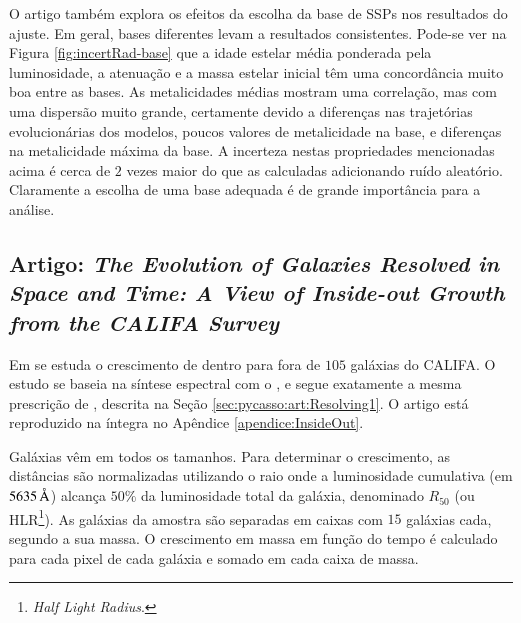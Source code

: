 O artigo também explora os efeitos da escolha da base de SSPs nos resultados do
ajuste. Em geral, bases diferentes levam a resultados consistentes.
Pode-se ver na Figura \ref{fig:incertRad-base} que a idade estelar
média ponderada pela luminosidade, a atenuação e a massa estelar inicial
têm uma concordância muito boa entre as bases. As metalicidades médias mostram
uma correlação, mas com uma dispersão muito grande, certamente devido a
diferenças nas trajetórias evolucionárias dos modelos, poucos valores
de metalicidade na base, e diferenças na metalicidade máxima da base. A
incerteza nestas propriedades mencionadas acima é cerca de $2$ vezes maior do
que as calculadas adicionando ruído aleatório. Claramente a escolha de uma base
adequada é de grande importância para a análise.



\subsection{Artigo: {\em The Evolution of Galaxies Resolved in Space and Time: A
View of Inside-out Growth from the CALIFA Survey}}
\label{sec:pycasso:art:InsideOut}

Em \citet{Perez2013} se estuda o crescimento de dentro para fora de $105$
galáxias do CALIFA. O estudo se baseia na síntese espectral com o \starlight, e
segue exatamente a mesma prescrição de \citet{CidFernandes2014}, descrita na
Seção \ref{sec:pycasso:art:Resolving1}. O artigo está reproduzido na íntegra no
Apêndice \ref{apendice:InsideOut}.


Galáxias vêm em todos os tamanhos. Para determinar o crescimento, as distâncias
são normalizadas utilizando o raio onde a luminosidade cumulativa (em
$5635\,\text{\normalfont\AA}$) alcança $50\%$ da luminosidade total da galáxia, denominado
$R_{50}$ (ou HLR\footnote{{\em Half Light Radius}.}). As galáxias da amostra são
separadas em caixas com $15$ galáxias cada, segundo a sua massa. O crescimento
em massa em função do tempo é calculado para cada pixel de cada galáxia e somado
em cada caixa de massa.

